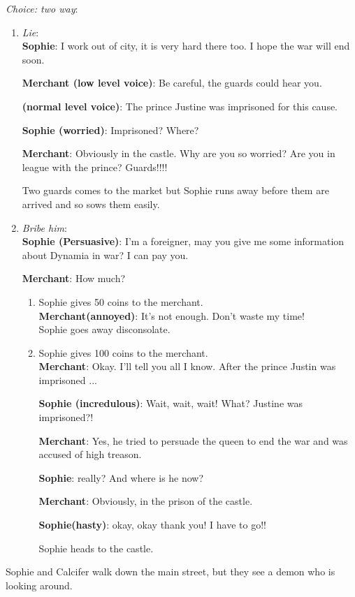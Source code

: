 \noindent \textit{Choice: two way}:
\begin{enumerate}
\item \textit{Lie}:\\
  
  \textbf{Sophie}: I work out of city, it is very hard there too. I hope the war will end soon.
  
  \textbf{Merchant (low level voice)}: Be careful, the guards could hear you.
  
  \textbf{(normal level voice)}: The prince Justine was imprisoned for this cause.
  
  \textbf{Sophie (worried)}: Imprisoned? Where? 

  \textbf{Merchant}: Obviously in the castle. Why are you so worried? Are you in league with the prince? Guards!!!!

  Two guards comes to the market but Sophie runs away before them are arrived and so sows them easily.
  
\item \textit{Bribe him}:\\
  
  \textbf{Sophie (Persuasive)}: I’m a foreigner, may you give me some information about Dynamia in war? I can pay you.
  
  \textbf{Merchant}: How much?
  
  \begin{enumerate}
  \item Sophie gives 50 coins to the merchant.\\

    \textbf{Merchant(annoyed)}: It’s not enough. Don’t waste my time!\\

    \noindent Sophie goes away disconsolate.

  \item Sophie gives 100 coins to the merchant.\\
    
    \textbf{Merchant}: Okay. I’ll tell you all I know. After the prince Justin was imprisoned ...

    \textbf{Sophie (incredulous)}: Wait, wait, wait! What? Justine was imprisoned?!
    
    \textbf{Merchant}: Yes, he tried to persuade the queen to end the war and was accused of high treason.
    
    \textbf{Sophie}: really? And where is he now?
    
    \textbf{Merchant}: Obviously, in the prison of the castle.
    
    \textbf{Sophie(hasty)}: okay, okay thank you! I have to go!!

    \noindent Sophie heads to the castle.
  \end{enumerate}
\end{enumerate}
\noindent Sophie and Calcifer walk down the main street, but they see a demon who is looking around.

